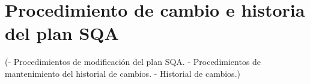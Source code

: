 \documentclass[spanish,a4paper,11pt, twoside]{report}	%
\begin{document}
\newpage
\mbox{}
\thispagestyle{empty}						%
\newpage

\chapter{ Procedimiento de cambio e historia del plan SQA}
	(- Procedimientos de modificación del plan SQA.
	- Procedimientos de mantenimiento del historial de
	cambios.
	- Historial de cambios.)
	


\newpage
\mbox{}
\thispagestyle{empty}						%
\newpage
\end{document}
